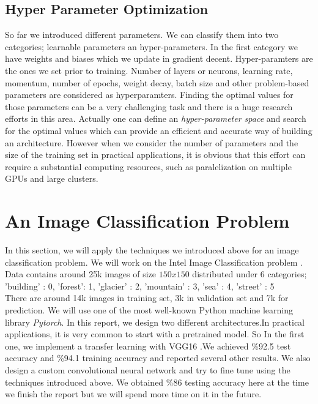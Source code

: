 \documentclass[12pt]{article}
\begin{document}
\subsection{Hyper Parameter Optimization}

So far we introduced different parameters. We can classify them into two categories; learnable parameters an hyper-parameters. In the first category we have weights and biases which we update in gradient decent. Hyper-paramters are the ones we set prior to training. Number of layers or neurons, learning rate, momentum, number of epochs, weight decay, batch size and other problem-based parameters are considered as hyperparamters. Finding the optimal values for those parameters can be a very challenging task and there is a huge research efforts in this area. Actually one can define an \textit{hyper-parameter space} and search for the optimal values which can provide an efficient and accurate way of building an architecture. However when we consider the number of parameters and the size of the training set in practical applications, it is obvious that this effort can require a substantial computing resources, such as paralelization on multiple GPUs and large clusters.
\section{An Image Classification Problem}

In this section, we will apply the techniques we introduced above for an image classification problem. We will work on the Intel Image Classification problem \cite{intel}. Data contains around 25k images of size $150x150$ distributed under 6 categories; \\

'building' : 0, 'forest': 1, 'glacier' : 2, 'mountain' : 3, 'sea' : 4, 'street' : 5 \\

There are around 14k images in training set, 3k in validation set and 7k for prediction. We will use one of the most well-known Python machine learning library \textit{Pytorch}. In this report, we design two different architectures.In practical applications, it is very common to start with a pretrained model. So In the first one, we implement a transfer learning with VGG16 \cite{vgg16}.We achieved \%92.5 test accuracy and \%94.1 training accuracy and reported several other results. We also design a custom convolutional neural network and try to fine tune using the techniques introduced above. We obtained \%86 testing accuracy here at the time we finish the report but we will spend more time on it in the future.
\end{document}
